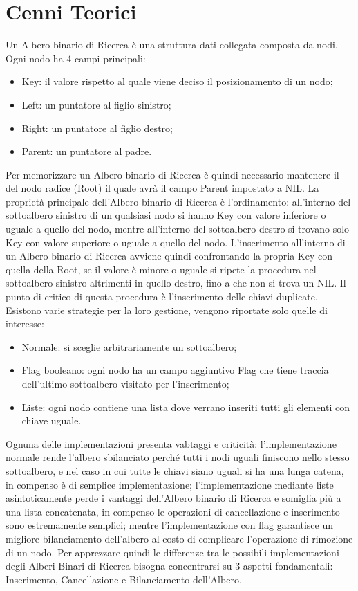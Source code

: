 \documentclass{article}
\begin{document}
\section{Cenni Teorici} \label{Teoria}
Un Albero binario di Ricerca è una struttura dati collegata composta da nodi. 
Ogni nodo ha 4 campi principali:
\begin{itemize}
    \item Key: il valore rispetto al quale viene deciso il posizionamento di un nodo;
    \item Left: un puntatore al figlio sinistro;
    \item Right: un puntatore al figlio destro;
    \item Parent: un puntatore al padre.
\end{itemize}
Per memorizzare un Albero binario di Ricerca è quindi necessario mantenere il del nodo radice (Root) il quale avrà il campo Parent impostato a NIL.
La proprietà principale dell'Albero binario di Ricerca è l'ordinamento: all'interno del sottoalbero sinistro di un qualsiasi nodo si hanno Key con valore inferiore o uguale a quello del nodo, mentre all'interno del sottoalbero destro si trovano solo Key con valore superiore o uguale a quello del nodo.
L'inserimento all'interno di un Albero binario di Ricerca avviene quindi confrontando la propria Key con quella della Root, se il valore è minore o uguale si ripete la procedura nel sottoalbero sinistro altrimenti in quello destro, fino a che non si trova un NIL.
Il punto di critico di questa procedura è l'inserimento delle chiavi duplicate.
Esistono varie strategie per la loro gestione, vengono riportate solo quelle di interesse:
\begin{itemize}
    \item Normale: si sceglie arbitrariamente un sottoalbero;
    \item Flag booleano: ogni nodo ha un campo aggiuntivo Flag che tiene traccia dell'ultimo sottoalbero visitato per l'inserimento;
    \item Liste: ogni nodo contiene una lista dove verrano inseriti tutti gli elementi con chiave uguale.
\end{itemize}
Ognuna delle implementazioni presenta vabtaggi e criticità: 
l'implementazione normale rende l'albero sbilanciato perché tutti i nodi uguali finiscono nello stesso sottoalbero, e nel caso in cui tutte le chiavi siano uguali si ha una lunga catena, in compenso è di semplice implementazione;
l'implementazione mediante liste asintoticamente perde i vantaggi dell'Albero binario di Ricerca e somiglia più a una lista concatenata, in compenso le operazioni di cancellazione e inserimento sono estremamente semplici; mentre l'implementazione con flag garantisce un migliore bilanciamento dell'albero al costo di complicare l'operazione di rimozione di un nodo.
Per apprezzare quindi le differenze tra le possibili implementazioni degli Alberi Binari di Ricerca bisogna concentrarsi su 3 aspetti fondamentali: Inserimento, Cancellazione e Bilanciamento dell'Albero.
\end{document}
